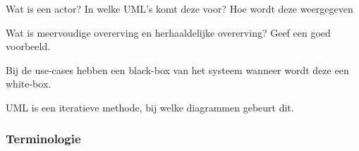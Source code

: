\begin{question}

\end{question}

\begin{solution}[print]

\end{solution}

\begin{question}
Wat is een actor? In welke UML's komt deze voor? Hoe wordt deze weergegeven
\end{question}

\begin{solution}[print]

\end{solution}

\begin{question}
Wat is meervoudige overerving en herhaaldelijke overerving? Geef een goed voorbeeld.
\end{question}

\begin{solution}[print]

\end{solution}

\begin{question}
Bij de use-cases hebben een black-box van het systeem wanneer wordt deze een white-box.
\end{question}

\begin{solution}[print]

\end{solution}

\begin{question}
UML is een iteratieve methode, bij welke diagrammen gebeurt dit.
\end{question}

\begin{solution}[print]

\end{solution}

\subsubsection{Terminologie}


